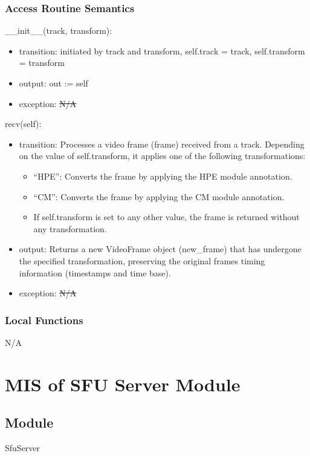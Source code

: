 \documentclass[12pt, titlepage]{article}
\newcommand{\rt}[1]{\textcolor{red}{#1}}
\begin{document}
\subsubsection{Access Routine Semantics}

\noindent \_\_init\_\_(track, transform):
\begin{itemize}
  \item transition: initiated by track and transform, self.track = track, self.transform = transform
  \item output: out := self
  \item exception: \sout{N/A} \rt{}
\end{itemize}

\noindent recv(self):
\begin{itemize}
\item transition: Processes a video frame (frame) received from a track. Depending
  on the value of self.transform, it applies one of the following
  transformations:
  \begin{itemize}
  \item ``HPE'': Converts the frame by applying the HPE module
    annotation.
  \item ``CM'': Converts the frame by applying the CM module annotation.
  \item If self.transform is set to any other value, the frame is returned without any
    transformation.
  \end{itemize}
\item output: Returns a new VideoFrame object (new\_frame) that has undergone the
  specified transformation, preserving the original frames timing information
  (timestamps and time base).
  \item exception: \sout{N/A} \rt{}
\end{itemize}

\subsubsection{Local Functions}
N/A

\section{MIS of SFU Server Module} \label{sec:sfuserver}

\subsection{Module}
SfuServer
\end{document}
